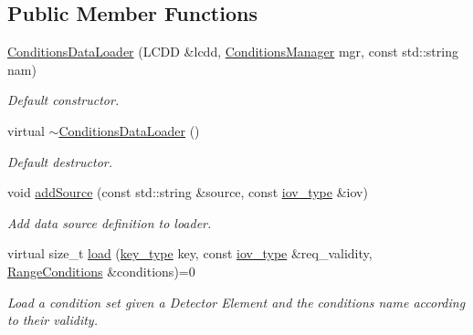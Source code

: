 \subsection*{Public Member Functions}
\begin{DoxyCompactItemize}
\item 
\hyperlink{class_d_d4hep_1_1_conditions_1_1_conditions_data_loader_a1d230a1e812648ae74e0857b279971e3}{ConditionsDataLoader} (LCDD \&lcdd, \hyperlink{class_d_d4hep_1_1_conditions_1_1_conditions_manager}{ConditionsManager} mgr, const std::string nam)
\begin{DoxyCompactList}\small\item\em Default constructor. \item\end{DoxyCompactList}\item 
virtual \hyperlink{class_d_d4hep_1_1_conditions_1_1_conditions_data_loader_a5918a0778c3e0f0f80a441a5f3b88770}{$\sim$ConditionsDataLoader} ()
\begin{DoxyCompactList}\small\item\em Default destructor. \item\end{DoxyCompactList}\item 
void \hyperlink{class_d_d4hep_1_1_conditions_1_1_conditions_data_loader_a13d300e82815a80b4c1601c95fff20cc}{addSource} (const std::string \&source, const \hyperlink{class_d_d4hep_1_1_i_o_v}{iov\_\-type} \&iov)
\begin{DoxyCompactList}\small\item\em Add data source definition to loader. \item\end{DoxyCompactList}\item 
virtual size\_\-t \hyperlink{class_d_d4hep_1_1_conditions_1_1_conditions_data_loader_a5ae9c04eb1198bf3ca9bc6d54e6bfd8c}{load} (\hyperlink{class_d_d4hep_1_1_conditions_1_1_conditions_data_loader_ac17b71656c9d6b5365c62d1d606ba8cc}{key\_\-type} key, const \hyperlink{class_d_d4hep_1_1_i_o_v}{iov\_\-type} \&req\_\-validity, \hyperlink{namespace_d_d4hep_1_1_conditions_ae765f0140a33973a430280f02b6062f4}{RangeConditions} \&conditions)=0
\begin{DoxyCompactList}\small\item\em Load a condition set given a Detector Element and the conditions name according to their validity. \item\end{DoxyCompactList}\item 

\end{DoxyCompactItemize}
